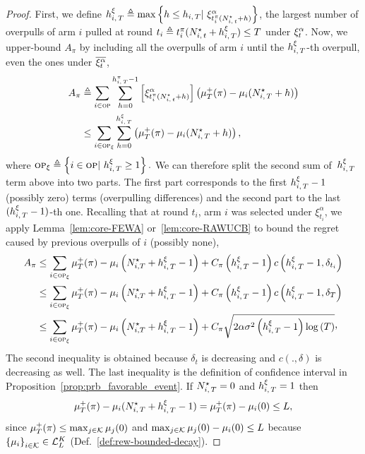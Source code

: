 \begin{proof}

First, we define $h_{i,\,T}^\xi \triangleq \max\left\{ h \leq h_{i,\,T} | \ \xi^\alpha_{t_i^{\pi}(N_{i,\,t}^\star + h)}\right\}$, the largest number of overpulls of arm $i$ pulled at round $t_i \triangleq t_i^{\pi}(N_{i,\,t}^\star + h_{i,\,T}^\xi) \leq T$ under $\xi^\alpha_t$. Now, we upper-bound $A_{\pi}$ by including all the overpulls of arm $i$ until the $h_{i,\,T}^\xi$-th overpull, even the ones under $\overline{\xi^\alpha_t}$,
\begin{align*}
A_{\pi} &\triangleq  \sum_{i\in \textsc{op}}   \sum_{h=0}^{h_{i,\,T}^{\pi}-1}  \left[ \xi^\alpha_{t_i^{\pi}(N_{i,\,t}^\star + h) }\right] \left(\mu^+_T(\pi) - \mu_i(N_{i,\,T}^{\star} + h)\right) \\
&
\leq \sum_{i\in \textsc{op}_\xi}   \sum_{h=0}^{h_{i,\,T}^\xi}  \left(\mu^+_T(\pi) - \mu_i(N_{i,\,T}^{\star} + h)\right),
\end{align*}
where $\textsc{op}_\xi \triangleq \left\{ i \in \textsc{op} | \  h_{i,\,T}^\xi \geq 1 \right\}.$ We can therefore split the second sum of~$h_{i,\,T}^\xi$ term above  into two parts. The first part corresponds to the first $h_{i,\,T}^\xi-1$ (possibly zero) terms (overpulling differences) and the second part to the last  $(h_{i,\,T}^\xi-1)$-th one. Recalling that at round $t_i$, arm $i$ was selected under $\xi^\alpha_{t_i}$, we apply
Lemma~\ref{lem:core-FEWA} or~\ref{lem:core-RAWUCB} to bound the regret caused by previous overpulls of $i$ (possibly none),
\begin{align}
A_{\pi} &\leq  \sum_{i \in \overpullSet_\xi}   \mu^+_T(\pi) - \mu_i\pa{N_{i, T}^\star + \hiT^\xi  -1} + C_\pi\pa{\hiT^\xi - 1}c\pa{\hiT^\xi-1, \delta_{t_i }} \label{eq:cor1-use1}\\
&\leq \sum_{i \in \overpullSet_\xi}   \mu^+_T(\pi) - \mu_i\pa{N_{i, T}^\star + \hiT^\xi  -1} + C_\pi\pa{\hiT^\xi - 1}c\pa{\hiT^\xi-1, \delta_{T}}\\
&\leq \sum_{i \in \overpullSet_\xi}   \mu^+_T(\pi) - \mu_i\pa{N_{i, T}^\star + \hiT^\xi  -1} + C_\pi\sqrt{2\alpha\sigma^2\pa{\hiT^\xi - 1}\log{\pa{T}}}\CommaBin
\label{eq:lasttimepdq}
\end{align}
 The second inequality is obtained because $\delta_t$ is decreasing and $c(.,\delta)$ is decreasing as well. The last inequality is the definition of confidence interval in Proposition~\ref{prop:prb_favorable_event}. 
 If  $N_{i,\,T}^{\star} = 0$ and $h_{i,\,T}^\xi = 1$ then
\[ \mu^+_T(\pi) - \mu_i(N_{i,\,T}^{\star} + h_{i,\,T}^\xi - 1) =  \mu^+_T(\pi) - \mu_i(0) \leq L,\] 
since $\mu^+_T (\pi) \leq \max_{j\in\mathcal{K}}\mu_j(0)$ and  $\max_{j\in\mathcal{K}}\mu_j(0) - \mu_i(0) \leq L$ because $\left\{\mu_i\right\}_{i \in \mathcal{K}} \in \mathcal{L}_L^K$ (Def.~\ref{def:rew-bounded-decay}).

\end{proof}
